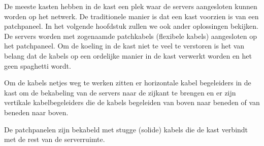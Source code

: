 De meeste kasten hebben in de kast een plek waar de servers aangesloten kunnen worden op het netwerk. De traditionele manier is dat een kast voorzien is van een patchpaneel. In het volgende hoofdstuk zullen we ook ander oplossingen bekijken. De servers worden met zogenaamde patchkabels (flexibele kabels) aangesloten op het patchpaneel. Om de koeling in de kast niet te veel te verstoren is het van belang dat de kabels op een ordelijke manier in de kast verwerkt worden en het geen spaghetti wordt.

Om de kabels netjes weg te werken zitten er horizontale kabel begeleiders in de kast om de bekabeling van de servers naar de zijkant te brengen en er zijn vertikale kabelbegeleiders die de kabels begeleiden van boven naar beneden of van beneden naar boven.

De patchpanelen zijn bekabeld met stugge (solide) kabels die de kast verbindt met de rest van de serverruimte.
